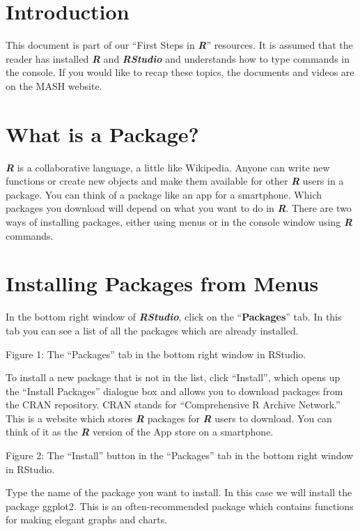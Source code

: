 \documentclass[
]{book}
\begin{document}
\section{Introduction}\label{introduction-7}

This document is part of our ``First Steps in \textbf{\emph{R}}'' resources. It is assumed that the reader has installed \textbf{\emph{R}} and \textbf{\emph{RStudio}} and understands how to type commands in the console. If you would like to recap these topics, the documents and videos are on the MASH website.

\section{What is a Package?}\label{what-is-a-package}

\textbf{\emph{R}} is a collaborative language, a little like Wikipedia. Anyone can write new functions or create new objects and make them available for other \textbf{\emph{R}} users in a package. You can think of a package like an app for a smartphone. Which packages you download will depend on what you want to do in \textbf{\emph{R}}. There are two ways of installing packages, either using menus or in the console window using \textbf{\emph{R}} commands.

\section{Installing Packages from Menus}\label{installing-packages-from-menus}

In the bottom right window of \textbf{\emph{RStudio}}, click on the ``\textbf{Packages}'' tab. In this tab you can see a list of all the packages which are already installed.

Figure 1: The ``Packages'' tab in the bottom right window in RStudio.

To install a new package that is not in the list, click ``Install'', which opens up the ``Install Packages'' dialogue box and allows you to download packages from the CRAN repository. CRAN stands for ``Comprehensive R Archive Network.'' This is a website which stores \textbf{\emph{R}} packages for \textbf{\emph{R}} users to download. You can think of it as the \textbf{\emph{R}} version of the App store on a smartphone.

Figure 2: The ``Install'' button in the ``Packages'' tab in the bottom right window in RStudio.

Type the name of the package you want to install. In this case we will install the package ggplot2. This is an often-recommended package which contains functions for making elegant graphs and charts.
\end{document}
